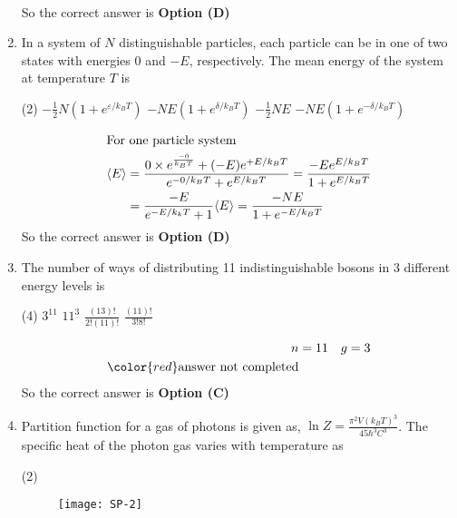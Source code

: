 \begin{enumerate}
\begin{answer}
\begin{align*}
\end{align*}
So the correct answer is \textbf{Option (D)}
\end{answer}
	\item In a system of $N$ distinguishable particles, each particle can be in one of two states with energies 0 and $-E$, respectively. The mean energy of the system at temperature $T$ is
\begin{tasks}(2)
\task[\textbf{A.}] $-\frac{1}{2} N\left(1+e^{\varepsilon / k_{B} T}\right)$
\task[\textbf{B.}] $-N E\left(1+e^{\delta / k_{B} T}\right)$
\task[\textbf{C.}] $-\frac{1}{2} N E$
\task[\textbf{D.}] $-N E\left(1+e^{-\delta / k_{B} T}\right)$
\end{tasks}
\begin{answer}
\begin{align*}
\intertext{For one particle system}
\langle E\rangle&=\frac{0 \times e^{\frac{-0}{k_{B} T}}+(-E) e^{+E / k_{B} T}}{e^{-0 / k_{B} T}+e^{E / k_{B} T}}=\frac{-E e^{E / k_{B} T}}{1+e^{E / k_{B} T}}\\&=\frac{-E}{e^{-E / k_{k} T}+1}\langle E\rangle=\frac{-N E}{1+e^{-E / k_{B} T}}
\end{align*}
So the correct answer is \textbf{Option (D)}
\end{answer}
	\item The number of ways of distributing 11 indistinguishable bosons in 3 different energy levels is
\begin{tasks}(4)
\task[\textbf{A.}]  $3^{11}$
\task[\textbf{B.}] $11^{3}$
\task[\textbf{C.}] $\frac{(13) !}{2 !(11) !}$
\task[\textbf{D.}]  $\frac{(11) !}{3 ! 8 !}$
\end{tasks}
\begin{answer}
\begin{align*}
n&=11 \quad g=3\\
\color{red}\text{answer not completed}
\end{align*}
So the correct answer is \textbf{Option (C)}
\end{answer}
	\item Partition function for a gas of photons is given as, $\ln Z=\frac{\pi^{2} V\left(k_{B} T\right)^{3}}{45 \hbar^{3} C^{3}}$. The specific heat of the photon gas varies with temperature as
\begin{tasks}(2)
\task[\textbf{A.}] \begin{figure}[H]
	\centering
	\texttt{[image: SP-2]}
\end{figure}
\task[\textbf{B.}] \begin{figure}[H]

\end{figure}
\end{tasks}
\end{enumerate}
